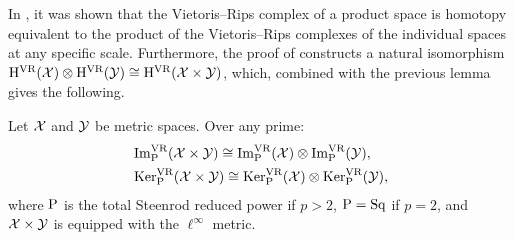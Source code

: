 In \cite[Prop.~10.2]{adamaszek2017VietorisProduct}, it was shown that the Vietoris--Rips complex of a product space is homotopy equivalent to the product of the Vietoris--Rips complexes of the individual spaces at any specific scale.
Furthermore, the proof of \cite[Thm.~6.1(1)]{lim2024vietoris} constructs a natural isomorphism $\mathrm{H}^{\mathrm{VR}}(\mathcal{X}) \otimes \mathrm{H}^{\mathrm{VR}}(\mathcal{Y}) \cong \mathrm{H}^{\mathrm{VR}}(\mathcal{X} \times \mathcal{Y})$, which, combined with the previous lemma gives the following.

\theorem
Let $\mathcal{X}$ and $\mathcal{Y}$ be metric spaces.
Over any prime:
\begin{align*}
	&\operatorname{Im}^{\mathrm{VR}}_{\mathrm{P}}(\mathcal{X} \times \mathcal{Y}) \cong \operatorname{Im}^{\mathrm{VR}}_{\mathrm{P}}(\mathcal{X}) \otimes \operatorname{Im}^{\mathrm{VR}}_{\mathrm{P}}(\mathcal{Y}), \\
	&\operatorname{Ker}^{\mathrm{VR}}_{\mathrm{P}}(\mathcal{X} \times \mathcal{Y}) \cong \operatorname{Ker}^{\mathrm{VR}}_{\mathrm{P}}(\mathcal{X}) \otimes \operatorname{Ker}^{\mathrm{VR}}_{\mathrm{P}}(\mathcal{Y}),
\end{align*}
where \(\mathrm{P}\) is the total Steenrod reduced power if \(p > 2\), \(\mathrm{P} = \mathrm{Sq}\) if \(p = 2\), and \(\mathcal{X} \times \mathcal{Y}\) is equipped with the \(\ell^\infty\) metric.